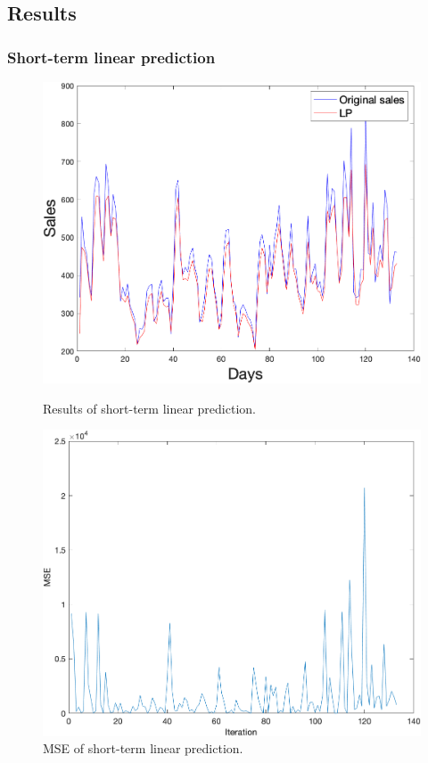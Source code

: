     \subsection{Results} \label{subsec:experimentResults}
        \subsubsection{Short-term linear prediction} \label{subsec:res_slp}
        \begin{figure}[h]
            \centering
            \begin{minipage}{0.45\textwidth}
                \centering
                \includegraphics[width=1\textwidth]{figures/expLP.png}
                \caption{Results of short-term linear prediction.}
                \label{fig:slpres}
            \end{minipage}\hfill
            \begin{minipage}{0.45\textwidth}
                \centering
                \includegraphics[width=\textwidth]{figures/expMseLP.png}
                \caption{MSE of short-term linear prediction.}
                \label{fig:slpmse}
            \end{minipage}
        \end{figure}
        \newpage

